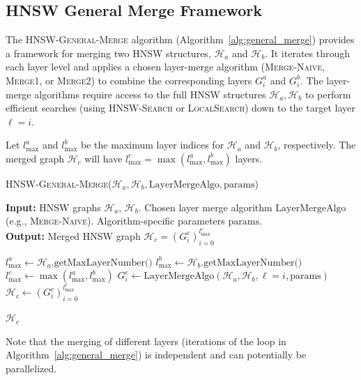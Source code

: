 \documentclass{article}
\begin{document}
\subsection{HNSW General Merge Framework}

The \textsc{HNSW-General-Merge} algorithm (Algorithm~\ref{alg:general_merge}) provides a framework for merging two HNSW structures, $\mathcal{H}_a$ and $\mathcal{H}_b$. It iterates through each layer level and applies a chosen layer-merge algorithm (\textsc{Merge-Naive}, \textsc{Merge1}, or \textsc{Merge2}) to combine the corresponding layers $G^a_i$ and $G^b_i$. The layer-merge algorithms require access to the full HNSW structures $\mathcal{H}_a, \mathcal{H}_b$ to perform efficient searches (using \textsc{HNSW-Search} or \textsc{LocalSearch}) down to the target layer $\ell=i$.

Let $l_{\max}^a$ and $l_{\max}^b$ be the maximum layer indices for $\mathcal{H}_a$ and $\mathcal{H}_b$, respectively. The merged graph $\mathcal{H}_c$ will have $l_{\max}^c = \max(l_{\max}^a, l_{\max}^b)$ layers.

\begin{algorithm}
\caption{\textsc{HNSW-General-Merge}($\mathcal{H}_a, \mathcal{H}_b, \text{LayerMergeAlgo}, \text{params}$)}\label{alg:general_merge}
\textbf{Input:} HNSW graphs $\mathcal{H}_a$, $\mathcal{H}_b $. Chosen layer merge algorithm $\text{LayerMergeAlgo}$ (e.g., \textsc{Merge-Naive}). Algorithm-specific parameters $\text{params}$. \\
\textbf{Output:} Merged HNSW graph $\mathcal{H}_c = (G^c_i)_{i=0}^{l_{\max}^c}$
\begin{algorithmic}[1]
\State $l_{\max}^a \gets \mathcal{H}_a.\text{getMaxLayerNumber()}$
\State $l_{\max}^b \gets \mathcal{H}_b.\text{getMaxLayerNumber()}$
\State $l_{\max}^c \gets \max(l_{\max}^a, l_{\max}^b)$
     
    \State $G^c_i \gets \text{LayerMergeAlgo}(\mathcal{H}_a, \mathcal{H}_b, \ell=i, \text{params})$ 
\EndFor
\State $\mathcal{H}_c \gets (G^c_i)_{i=0}^{l_{\max}^c}$ %

\State \Return $\mathcal{H}_c$
\end{algorithmic}
\end{algorithm}

Note that the merging of different layers (iterations of the loop in Algorithm~\ref{alg:general_merge}) is independent and can potentially be parallelized.
\end{document}
